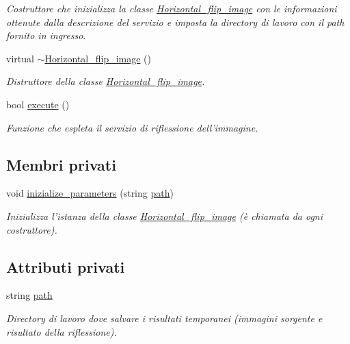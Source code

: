 \begin{DoxyCompactItemize}
\begin{DoxyCompactList}\small\item\em Costruttore che inizializza la classe \hyperlink{class_horizontal__flip__image}{Horizontal\-\_\-flip\-\_\-image} con le informazioni ottenute dalla descrizione del servizio e imposta la directory di lavoro con il path fornito in ingresso. \end{DoxyCompactList}\item 
\hypertarget{class_horizontal__flip__image_ab584c001738909be6f95c4b40295b924}{virtual \hyperlink{class_horizontal__flip__image_ab584c001738909be6f95c4b40295b924}{$\sim$\-Horizontal\-\_\-flip\-\_\-image} ()}\label{class_horizontal__flip__image_ab584c001738909be6f95c4b40295b924}

\begin{DoxyCompactList}\small\item\em Distruttore della classe \hyperlink{class_horizontal__flip__image}{Horizontal\-\_\-flip\-\_\-image}. \end{DoxyCompactList}\item 
bool \hyperlink{class_horizontal__flip__image_a938221e0bcaa7331d01444c77366339d}{execute} ()
\begin{DoxyCompactList}\small\item\em Funzione che espleta il servizio di riflessione dell'immagine. \end{DoxyCompactList}\end{DoxyCompactItemize}
\subsection*{Membri privati}
\begin{DoxyCompactItemize}
\item 
void \hyperlink{class_horizontal__flip__image_a19887934b05b36f2b3603535e5cac691}{inizialize\-\_\-parameters} (string \hyperlink{class_horizontal__flip__image_a56deaa91c8efad258a778d4fece9c81b}{path})
\begin{DoxyCompactList}\small\item\em Inizializza l'istanza della classe \hyperlink{class_horizontal__flip__image}{Horizontal\-\_\-flip\-\_\-image} (è chiamata da ogni costruttore). \end{DoxyCompactList}\end{DoxyCompactItemize}
\subsection*{Attributi privati}
\begin{DoxyCompactItemize}
\item 
\hypertarget{class_horizontal__flip__image_a56deaa91c8efad258a778d4fece9c81b}{string \hyperlink{class_horizontal__flip__image_a56deaa91c8efad258a778d4fece9c81b}{path}}\label{class_horizontal__flip__image_a56deaa91c8efad258a778d4fece9c81b}

\begin{DoxyCompactList}\small\item\em Directory di lavoro dove salvare i risultati temporanei (immagini sorgente e risultato della riflessione). \end{DoxyCompactList}\end{DoxyCompactItemize}
